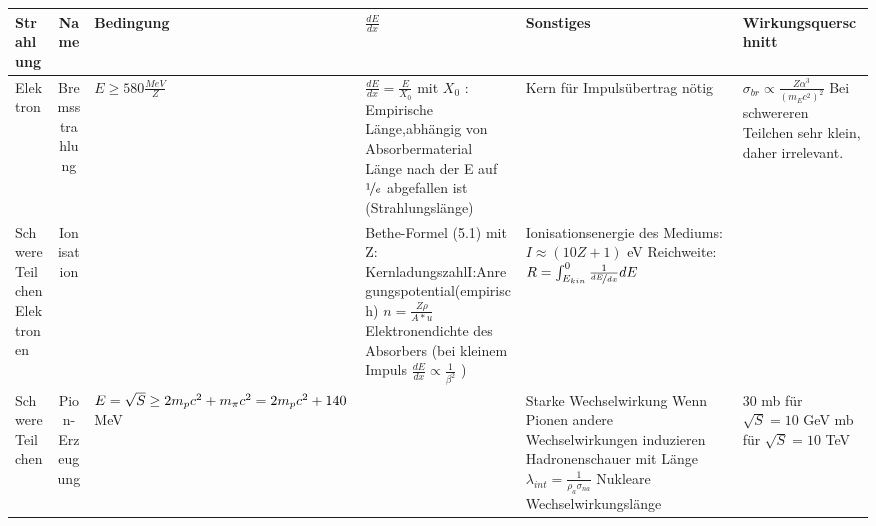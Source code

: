 \documentclass[Ex4_Zusammenfassung.tex]{subfiles}
\begin{document}
	\begin{table}
    \centering\setlength\tabcolsep{2pt}
        \begin{tabular} {p{1.6cm} | c | p{3.5cm} | p{4cm} | p{5cm} | p{5.5cm} } 
             \textbf{Strahlung} &\textbf{Name} &\textbf{Bedingung} & \centering \textbf{$\frac{dE}{dx}$} & \textbf{Sonstiges} & \textbf{Wirkungsquerschnitt} \\ 
 			\midrule
              Elektron & Bremsstrahlung & $E \geq 580 \frac{MeV}{Z} $ & $\frac{dE}{dx} = \frac{E}{X_0} $ \newline \newline mit $X_0$ : Empirische Länge,abhängig von Absorbermaterial Länge nach der E auf $ \nicefrac{1}{e} $ abgefallen ist (Strahlungslänge)  &  \centering Kern für Impulsübertrag nötig  & $ \sigma_{br} \propto \frac{Z \alpha^3}{(m_E c^2)^2} $ \newline Bei schwereren Teilchen sehr klein, daher irrelevant. \\ 
              \hline
              
              Schwere \newline Teilchen \newline Elektronen & Ionisation & & Bethe-Formel (5.1) \newline
              mit Z: Kernladungszahl\newline I:Anregungspotential(empirisch) \newline $ n = \frac{Z \rho}{A*u} $ Elektronendichte des Absorbers \newline (bei kleinem Impuls $ \frac{dE}{dx} \propto \frac{1}{\beta^2} $ ) & Ionisationsenergie des Mediums: \newline $ I \approx (10Z+1) $ eV \newline \newline 
              Reichweite: \newline  $ R = \int_{E_{kin}} ^0 \frac{1}{\nicefrac{dE}{dx}} dE $ & \\ 
              \hline 
              
              Schwere \newline Teilchen & Pion-Erzeugung & $ E = \sqrt{S} \geq 2m_p c^2 + m_{\pi} c^2 \newline  = 2m_p c^2 + 140 $ MeV & & Starke Wechselwirkung \newline Wenn Pionen andere Wechselwirkungen induzieren \newline Hadronenschauer mit Länge \newline $ \lambda_{int} = \frac{1}{\rho_{a} \sigma_{na}} $ \newline \newline Nukleare Wechselwirkungslänge & 30 mb für $ \sqrt{S} = 10 $ GeV \newline 80 mb für $ \sqrt{S} = 10 $ TeV \\ 
              \hline
              

\end{tabular}
\end{table}
\end{document}

